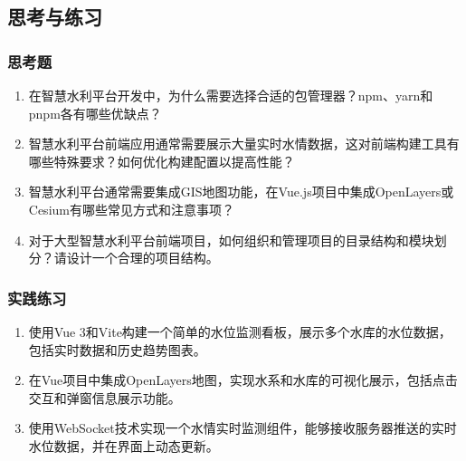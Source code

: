 \subsection{思考与练习}\label{ux601dux8003ux4e0eux7ec3ux4e60}

\subsubsection{思考题}\label{ux601dux8003ux9898}

\begin{enumerate}
\def\labelenumi{\arabic{enumi}.}
\item
  在智慧水利平台开发中，为什么需要选择合适的包管理器？npm、yarn和pnpm各有哪些优缺点？
\item
  智慧水利平台前端应用通常需要展示大量实时水情数据，这对前端构建工具有哪些特殊要求？如何优化构建配置以提高性能？
\item
  智慧水利平台通常需要集成GIS地图功能，在Vue.js项目中集成OpenLayers或Cesium有哪些常见方式和注意事项？
\item
  对于大型智慧水利平台前端项目，如何组织和管理项目的目录结构和模块划分？请设计一个合理的项目结构。
\end{enumerate}

\subsubsection{实践练习}\label{ux5b9eux8df5ux7ec3ux4e60}

\begin{enumerate}
\def\labelenumi{\arabic{enumi}.}
\item
  使用Vue
  3和Vite构建一个简单的水位监测看板，展示多个水库的水位数据，包括实时数据和历史趋势图表。
\item
  在Vue项目中集成OpenLayers地图，实现水系和水库的可视化展示，包括点击交互和弹窗信息展示功能。
\item
  使用WebSocket技术实现一个水情实时监测组件，能够接收服务器推送的实时水位数据，并在界面上动态更新。
\end{enumerate}
